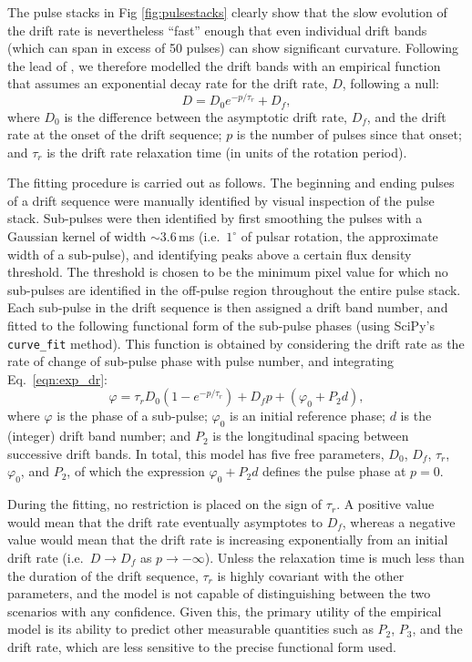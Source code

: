 \documentclass[twocolumn]{aastex631}
\begin{document}
The pulse stacks in Fig \ref{fig:pulsestacks} clearly show that the slow evolution of the drift rate is nevertheless ``fast'' enough that even individual drift bands (which can span in excess of 50 pulses) can show significant curvature.
Following the lead of \citet{Lyne1983}, we therefore modelled the drift bands with an empirical function that assumes an exponential decay rate for the drift rate, $D$, following a null:
\begin{equation}
    D = D_0 e^{-p/\tau_r} + D_f,
    \label{eqn:exp_dr}
\end{equation}
where $D_0$ is the difference between the asymptotic drift rate, $D_f$, and the drift rate at the onset of the drift sequence; $p$ is the number of pulses since that onset; and $\tau_r$ is the drift rate relaxation time (in units of the rotation period).

The fitting procedure is carried out as follows.
The beginning and ending pulses of a drift sequence were manually identified by visual inspection of the pulse stack.
Sub-pulses were then identified by first smoothing the pulses with a Gaussian kernel of width $\sim3.6\,$ms (i.e.\ $1^\circ$ of pulsar rotation, the approximate width of a sub-pulse), and identifying peaks above a certain flux density threshold.
The threshold is chosen to be the minimum pixel value for which no sub-pulses are identified in the off-pulse region throughout the entire pulse stack.
Each sub-pulse in the drift sequence is then assigned a drift band number, and fitted to the following functional form of the sub-pulse phases (using SciPy's \texttt{curve\_fit} method).
This function is obtained by considering the drift rate as the rate of change of sub-pulse phase with pulse number, and integrating Eq.~\eqref{eqn:exp_dr}:
\begin{equation}
    \varphi = \tau_r D_0 \left(1 - e^{-p/\tau_r}\right) + D_f p + (\varphi_0 + P_2 d),
    \label{eqn:exp_phase}
\end{equation}
where $\varphi$ is the phase of a sub-pulse; $\varphi_0$ is an initial reference phase; $d$ is the (integer) drift band number; and $P_2$ is the longitudinal spacing between successive drift bands.
In total, this model has five free parameters, $D_0$, $D_f$, $\tau_r$, $\varphi_0$, and $P_2$, of which the expression $\varphi_0 + P_2 d$ defines the pulse phase at $p = 0$.

During the fitting, no restriction is placed on the sign of $\tau_r$.
A positive value would mean that the drift rate eventually asymptotes to $D_f$, whereas a negative value would mean that the drift rate is increasing exponentially from an initial drift rate (i.e.\  $D\rightarrow D_f$ as $p\rightarrow -\infty$).
Unless the relaxation time is much less than the duration of the drift sequence, $\tau_r$ is highly covariant with the other parameters, and the model is not capable of distinguishing between the two scenarios with any confidence.
Given this, the primary utility of the empirical model is its ability to predict other measurable quantities such as $P_2$, $P_3$, and the drift rate, which are less sensitive to the precise functional form used.
\end{document}
